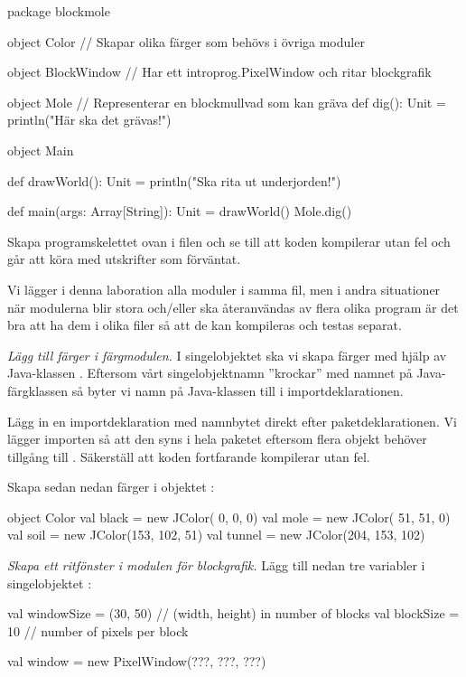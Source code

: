 \begin{Code}
package blockmole

object Color {
  // Skapar olika färger som behövs i övriga moduler
}

object BlockWindow {
  // Har ett introprog.PixelWindow och ritar blockgrafik
}

object Mole { // Representerar en blockmullvad som kan gräva
  def dig(): Unit = println("Här ska det grävas!")
}

object Main {
  def drawWorld(): Unit = println("Ska rita ut underjorden!")

  def main(args: Array[String]): Unit = {
    drawWorld()
    Mole.dig()
  }
}
\end{Code}

\noindent Skapa programskelettet ovan i filen  och se till att koden kompilerar utan fel och går att köra med utskrifter som förväntat.

Vi lägger i denna laboration alla moduler i samma fil, men i andra situationer när  modulerna blir stora och/eller ska återanvändas av flera olika program är det bra att ha dem i olika filer så att de kan kompileras och testas separat.


\Task \emph{Lägg till färger i färgmodulen.} I singelobjektet  ska vi skapa färger med hjälp av Java-klassen . Eftersom vårt singelobjektnamn ''krockar'' med namnet på Java-färgklassen så byter vi namn på Java-klassen till  i importdeklarationen.

\Subtask
Lägg in en importdeklaration med namnbytet direkt efter paketdeklarationen. Vi lägger importen så att den syns i hela paketet eftersom flera objekt behöver tillgång till . Säkerställ att koden fortfarande kompilerar utan fel.

\Subtask
Skapa sedan nedan färger i objektet :
\begin{Code}
object Color {
  val black  = new JColor(  0,   0,   0)
  val mole   = new JColor( 51,  51,   0)
  val soil   = new JColor(153, 102,  51)
  val tunnel = new JColor(204, 153, 102)
}
\end{Code}


\Task \emph{Skapa ett ritfönster i modulen för blockgrafik.} Lägg till nedan tre variabler i singelobjektet :

\begin{Code}
  val windowSize = (30, 50)  // (width, height) in number of blocks
  val blockSize  = 10        // number of pixels per block

  val window = new PixelWindow(???, ???, ???)
\end{Code}

